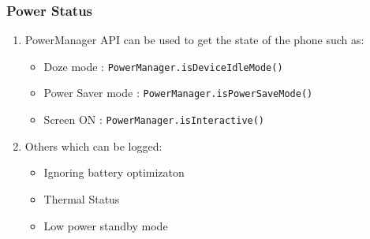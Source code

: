 \documentclass{article}
\begin{document}
\subsubsection{Power Status}
\label{sec: Alarm Triggering - Power Status}
\begin{enumerate}
    \item PowerManager API can be used to get the state of the phone such as:
    \begin{itemize}
        \item Doze mode : \texttt{PowerManager.isDeviceIdleMode()}
        \item Power Saver mode : \texttt{PowerManager.isPowerSaveMode()}
        \item Screen ON : \texttt{PowerManager.isInteractive()}
    \end{itemize}
    \item Others which can be logged: 
    \begin{itemize}
        \item Ignoring battery optimizaton
        \item Thermal Status
        \item Low power standby mode
    \end{itemize}
\end{enumerate}
\end{document}

